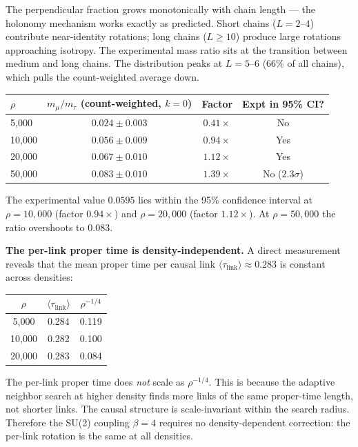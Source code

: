 \documentclass[11pt,letterpaper]{article}
\begin{document}
\noindent The perpendicular fraction grows monotonically with chain
length --- the holonomy mechanism works exactly as predicted. Short
chains ($L = 2$--$4$) contribute near-identity rotations; long chains
($L \geq 10$) produce large rotations approaching isotropy. The
experimental mass ratio sits at the transition between medium and long
chains. The distribution peaks at $L = 5$--$6$ (66\% of all chains),
which pulls the count-weighted average down.

\begin{center}
\begin{tabular}{@{}lccc@{}}
\toprule
$\rho$ & $m_\mu/m_\tau$ (count-weighted, $k = 0$) & Factor & Expt in 95\% CI? \\
\midrule
5{,}000 & $0.024 \pm 0.003$ & $0.41\times$ & No \\
10{,}000 & $0.056 \pm 0.009$ & $0.94\times$ & Yes \\
20{,}000 & $0.067 \pm 0.010$ & $1.12\times$ & Yes \\
50{,}000 & $0.083 \pm 0.010$ & $1.39\times$ & No ($2.3\sigma$) \\
\bottomrule
\end{tabular}
\end{center}

\noindent The experimental value $0.0595$ lies within the 95\%
confidence interval at $\rho = 10{,}000$ (factor $0.94\times$) and
$\rho = 20{,}000$ (factor $1.12\times$).  At $\rho = 50{,}000$ the
ratio overshoots to $0.083$.

\medskip
\noindent\textbf{The per-link proper time is density-independent.}
A direct measurement reveals that the mean proper time per causal
link $\langle\tau_{\mathrm{link}}\rangle \approx 0.283$ is constant
across densities:
\begin{center}
\begin{tabular}{@{}ccc@{}}
\toprule
$\rho$ & $\langle\tau_{\mathrm{link}}\rangle$ & $\rho^{-1/4}$ \\
\midrule
5{,}000 & 0.284 & 0.119 \\
10{,}000 & 0.282 & 0.100 \\
20{,}000 & 0.283 & 0.084 \\
\bottomrule
\end{tabular}
\end{center}
\noindent The per-link proper time does \emph{not} scale as
$\rho^{-1/4}$.  This is because the adaptive neighbor search at
higher density finds more links of the same proper-time length, not
shorter links.  The causal structure is scale-invariant within the
search radius.  Therefore the SU(2) coupling $\beta = 4$ requires
no density-dependent correction: the per-link rotation is the same
at all densities.
\end{document}
